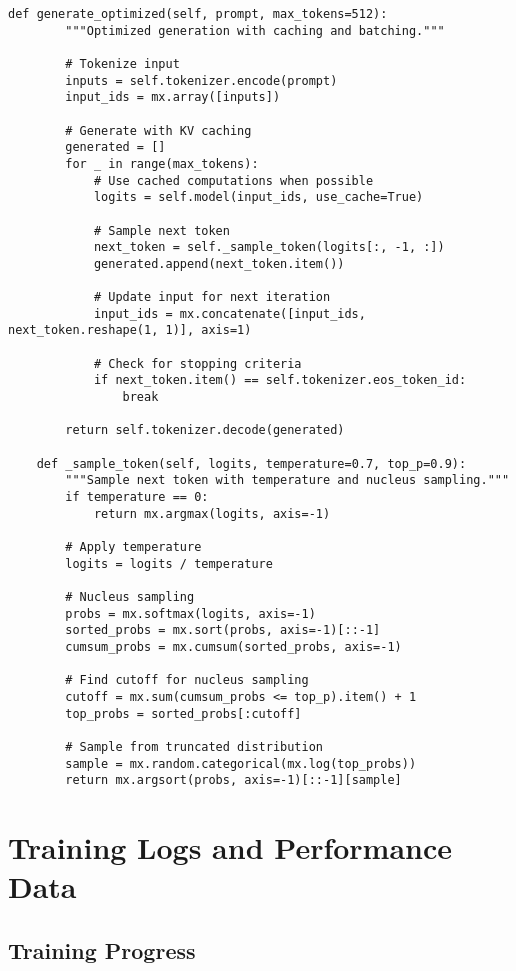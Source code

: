 \begin{table}[H]
\begin{lstlisting}[caption=Optimized inference implementation,label=lst:inference-opt]
    def generate_optimized(self, prompt, max_tokens=512):
        """Optimized generation with caching and batching."""
        
        # Tokenize input
        inputs = self.tokenizer.encode(prompt)
        input_ids = mx.array([inputs])
        
        # Generate with KV caching
        generated = []
        for _ in range(max_tokens):
            # Use cached computations when possible
            logits = self.model(input_ids, use_cache=True)
            
            # Sample next token
            next_token = self._sample_token(logits[:, -1, :])
            generated.append(next_token.item())
            
            # Update input for next iteration
            input_ids = mx.concatenate([input_ids, next_token.reshape(1, 1)], axis=1)
            
            # Check for stopping criteria
            if next_token.item() == self.tokenizer.eos_token_id:
                break
        
        return self.tokenizer.decode(generated)
    
    def _sample_token(self, logits, temperature=0.7, top_p=0.9):
        """Sample next token with temperature and nucleus sampling."""
        if temperature == 0:
            return mx.argmax(logits, axis=-1)
        
        # Apply temperature
        logits = logits / temperature
        
        # Nucleus sampling
        probs = mx.softmax(logits, axis=-1)
        sorted_probs = mx.sort(probs, axis=-1)[::-1]
        cumsum_probs = mx.cumsum(sorted_probs, axis=-1)
        
        # Find cutoff for nucleus sampling
        cutoff = mx.sum(cumsum_probs <= top_p).item() + 1
        top_probs = sorted_probs[:cutoff]
        
        # Sample from truncated distribution
        sample = mx.random.categorical(mx.log(top_probs))
        return mx.argsort(probs, axis=-1)[::-1][sample]
\end{lstlisting}

\section{Training Logs and Performance Data}
\label{appendix:logs}

\subsection{Training Progress}


\end{table}
